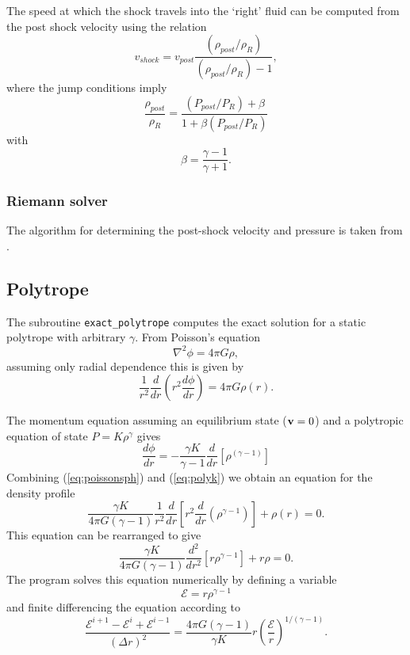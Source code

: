 \documentclass[a4paper,10pt]{article}
\begin{document}
 The speed at which the shock travels into the `right' fluid can be computed from the post shock
velocity using the relation
\begin{equation}
v_{shock} = v_{post}\frac{(\rho_{post}/\rho_R)}{(\rho_{post}/\rho_R)- 1},
\end{equation}
where the jump conditions imply
\begin{equation}
\frac{\rho_{post}}{\rho_R} = \frac{(P_{post}/P_R) + \beta}{1 + \beta (P_{post}/P_R)}
\end{equation}
with
\begin{equation}
\beta = \frac{\gamma - 1}{\gamma + 1}.
\end{equation}

\subsubsection{ Riemann solver}
 The algorithm for determining the post-shock velocity and pressure is taken
from \citet{toro92}.

\subsection{Polytrope}
 The subroutine \verb+exact_polytrope+ computes the exact solution for a static polytrope with
arbitrary $\gamma$. From Poisson's equation
\begin{equation}
\nabla^2 \phi = 4\pi G \rho,
\end{equation}
assuming only radial dependence this is given by
\begin{equation}
\frac{1}{r^{2}} \frac{d}{dr} \left(r^{2} \frac{d\phi}{dr} \right) = 4\pi G \rho(r).
\label{eq:poissonsph}
\end{equation}
  
  The momentum equation assuming an equilibrium state (${\bf v} = 0$) and a
polytropic equation of state $P = K\rho^{\gamma}$ gives
\begin{equation}
\frac{d\phi}{dr} = - \frac{\gamma K}{\gamma-1}\frac{d}{dr} \left[\rho^{(\gamma -1)} \right]
\label{eq:polyk}
\end{equation}
Combining (\ref{eq:poissonsph}) and (\ref{eq:polyk}) we obtain an equation for the density profile
\begin{equation}
\frac{\gamma K}{4\pi G (\gamma - 1)} \frac{1}{r^{2}} \frac{d}{dr} \left[r^{2}
\frac{d}{dr}\left( \rho^{\gamma-1} \right) \right] + \rho(r) = 0.
\label{eq:dens}
\end{equation}
This equation can be rearranged to give
\begin{equation}
\frac{\gamma K}{4\pi G (\gamma - 1)} \frac{d^2}{dr^2}
\left[r\rho^{\gamma-1}\right] + r\rho = 0.
\end{equation}
 The program solves this equation numerically by defining a variable
\begin{equation}
\mathcal{E} = r \rho^{\gamma-1}
\end{equation}
and finite differencing the equation according to
\begin{equation}
\frac{\mathcal{E}^{i+1} - \mathcal{E}^i + \mathcal{E}^{i-1}}{(\Delta r)^2} =
\frac{4\pi G (\gamma - 1)}{\gamma K} r
\left(\frac{\mathcal{E}}{r}\right)^{1/(\gamma-1)}.
\end{equation}
\end{document}
